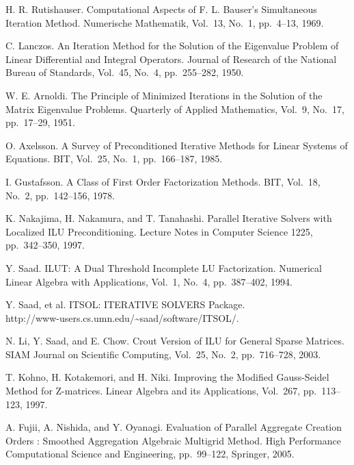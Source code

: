 \documentclass[a4paper]{jarticle}
\begin{document}
{\begin{thebibliography}{10}
H. R. Rutishauser.
\newblock Computational Aspects of F. L. Bauser's Simultaneous Iteration
	Method.
\newblock Numerische Mathematik, Vol.~13, No.~1, pp.\ 4--13, 1969.

C. Lanczos.
\newblock An Iteration Method for the Solution of the Eigenvalue Problem
	of Linear Differential and Integral Operators.
\newblock Journal of Research of the National Bureau of Standards, Vol.~45, No.~4, pp.\ 255--282, 1950.

W. E. Arnoldi.
\newblock The Principle of Minimized Iterations in the Solution of the Matrix Eigenvalue Problems.
\newblock Quarterly of Applied Mathematics, Vol.~9, No.~17, pp.\ 17--29, 1951.

O. Axelsson.
\newblock A Survey of Preconditioned Iterative Methods for Linear
	Systems of Equations.
\newblock BIT, Vol.~25, No.~1, pp.\ 166--187, 1985.

I. Gustafsson.
\newblock A Class of First Order Factorization Methods.
\newblock BIT, Vol.~18, No.~2, pp.\ 142--156, 1978.

K. Nakajima, H. Nakamura, and T. Tanahashi.
\newblock Parallel Iterative Solvers with Localized ILU Preconditioning.
\newblock Lecture Notes in Computer Science 1225, pp.\ 342--350, 1997.

Y. Saad.
\newblock ILUT: A Dual Threshold Incomplete LU Factorization.
\newblock Numerical Linear Algebra with Applications, Vol.~1, No.~4, pp.\ 387--402, 1994. 

Y. Saad, et al.
\newblock ITSOL: ITERATIVE SOLVERS Package. \\
\newblock http://www-users.cs.umn.edu/\textasciitilde saad/software/ITSOL/.

N. Li, Y. Saad, and E. Chow.
\newblock Crout Version of ILU for General Sparse Matrices.
\newblock SIAM Journal on Scientific Computing, Vol.~25, No.~2, pp.\ 716--728, 2003. 

T. Kohno, H. Kotakemori, and H. Niki.
\newblock Improving the Modified Gauss-Seidel Method for Z-matrices.
\newblock Linear Algebra and its Applications, Vol.~267, pp.\ 113--123, 1997.

A. Fujii, A. Nishida, and Y. Oyanagi.
\newblock Evaluation of Parallel Aggregate Creation Orders : Smoothed Aggregation Algebraic Multigrid Method.
\newblock High Performance Computational Science and Engineering, pp.\ 99--122, Springer, 2005. 


\end{thebibliography}}
\end{document}
